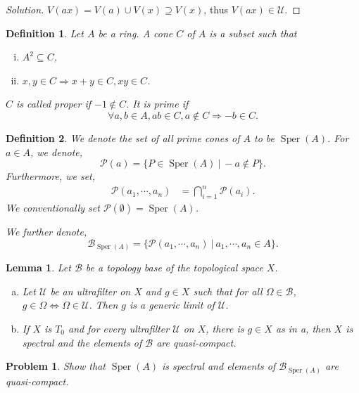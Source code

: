 \documentclass[8pt]{article}
\numberwithin{equation}{section}
\newenvironment{solution}{\begin{proof}[Solution]}{\end{proof}}
\newtheorem{definition}{Definition}[section]
\newtheorem{lemma}{Lemma}[section]
\newtheorem{problem}{Problem}[section]
\DeclareMathOperator{\Sper}{Sper}
\newcommand{\U}[0]{\mathcal{U}}
\newcommand{\B}[0]{\mathcal{B}}
\newcommand{\sep}[0]{\:|\:}
\begin{document}
\begin{solution}
  $V(ax)=V(a)\cup V(x)\supseteq V(x)$, thus $V(ax)\in\U$.
\end{solution}
\begin{definition}
  Let $A$ be a ring. A cone $C$ of $A$ is a subset such that 
  \begin{enumerate}[i.]
    \item $A^2\subseteq C$,
    \item $x,y\in C\Rightarrow x+y\in C,xy\in C$.
  \end{enumerate}
  $C$ is called proper if $-1\not\in C$. It is prime if 
  \begin{equation*}
    \forall a,b\in A, ab\in C,a\not\in C\Rightarrow -b\in C.
  \end{equation*}
\end{definition}
\begin{definition}
  We denote the set of all prime cones of $A$ to be $\Sper(A)$. For $a\in A$, we denote,
  \begin{equation*}
    \mathcal{P}(a) = \{P\in\Sper(A)\sep -a\not\in P\}.
  \end{equation*}
  Furthermore, we set,
  \begin{align*}
    \mathcal{P}(a_1,\cdots,a_n) &= \bigcap_{i=1}^n\mathcal{P}(a_i).
  \end{align*}
  We conventionally set $\mathcal{P}(\emptyset) = \Sper(A)$.
  \par We further denote,
  \begin{equation*}
    \mathcal{B}_{\Sper(A)} = \{\mathcal{P}(a_1,\cdots,a_n)\sep a_1,\cdots,a_n\in A\}.
  \end{equation*}
\end{definition}
\begin{lemma}
    \label{lemma_1}
    Let $\mathcal{B}$ be a topology base of the topological space $X$.
    \begin{enumerate}[a)]
        \item Let $\U$ be an ultrafilter on $X$ and $g\in X$ such that for all $\Omega\in\mathcal{B}$, $g\in\Omega \Leftrightarrow\Omega\in\U$. Then $g$ is a generic limit of $\U$.
        \item If $X$ is $T_0$ and for every ultrafilter $\U$ on $X$, there is $g\in X$ as in a, then $X$ is spectral and the elements of $\B$ are quasi-compact.
    \end{enumerate}
\end{lemma}
\begin{problem}
  Show that $\Sper(A)$ is spectral and elements of $\mathcal{B}_{\Sper(A)}$ are quasi-compact.
\end{problem}
\end{document}
